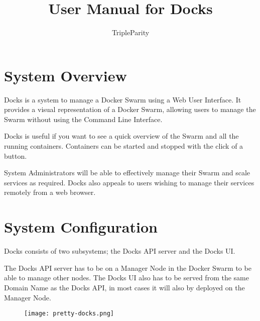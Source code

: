 \documentclass[]{article}
\title{User Manual for Docks}
\author{TripleParity}
\date{}
\begin{document}
	
\maketitle

\tableofcontents

\section{System Overview}
Docks is a system to manage a Docker Swarm using a Web User Interface. It provides a visual representation of a Docker Swarm, allowing users to manage the Swarm without using the Command Line Interface.

Docks is useful if you want to see a quick overview of the Swarm and all the running containers. Containers can be started and stopped with the click of a button.

System Administrators will be able to effectively manage their Swarm and scale services as required. Docks also appeals to users wishing to manage their services remotely from a web browser.

\section{System Configuration}
Docks consists of two subsystems; the Docks API server and the Docks UI.

The Docks API server has to be on a Manager Node in the Docker Swarm to be able to manage other nodes. The Docks UI also has to be served from the same Domain Name as the Docks API, in most cases it will also by deployed on the Manager Node.

\begin{figure}[h]
	\centering
	\texttt{[image: pretty-docks.png]}
\end{figure}

\pagebreak
\end{document}

